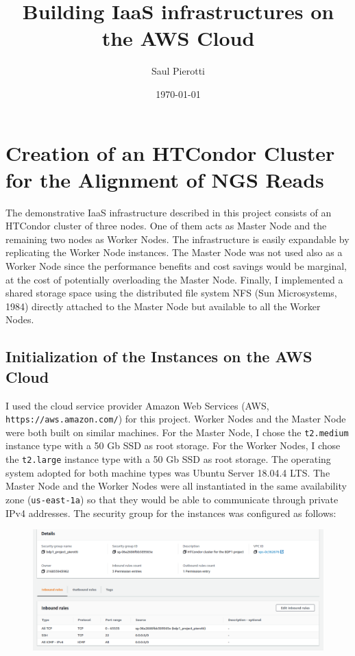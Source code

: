 \documentclass{article}
\begin{document}
\title{Building IaaS infrastructures on the AWS Cloud}
\author{Saul Pierotti}
\date{\today}

\maketitle

\section{Creation of an HTCondor Cluster for the Alignment of NGS Reads}
The demonstrative IaaS infrastructure described in this project consists of an HTCondor cluster of three nodes.
One of them acts as Master Node and the remaining two nodes as Worker Nodes.
The infrastructure is easily expandable by replicating the Worker Node instances.
The Master Node was not used also as a Worker Node since the performance benefits and cost savings would be marginal, at the cost of potentially overloading the Master Node.
Finally, I implemented a shared storage space using the distributed file system NFS (Sun Microsystems, 1984) directly attached to the Master Node but available to all the Worker Nodes.

\subsection{Initialization of the Instances on the AWS Cloud}
I used the cloud service provider Amazon Web Services (AWS, \texttt{https://aws.amazon.com/}) for this project.
Worker Nodes and the Master Node were both built on similar machines.
For the Master Node, I chose the \texttt{t2.medium} instance type with a 50 Gb SSD as root storage.
For the Worker Nodes, I chose the \texttt{t2.large} instance type with a 50 Gb SSD as root storage.
The operating system adopted for both machine types was Ubuntu Server 18.04.4 LTS\@.
The Master Node and the Worker Nodes were all instantiated in the same availability zone (\texttt{us-east-1a}) so that they would be able to communicate through private IPv4 addresses.
The security group for the instances was configured as follows:

\begin{figure}[!h]
    \center%
    \includegraphics[width=\textwidth]{./images/security-group.png}
\end{figure}
\end{document}
